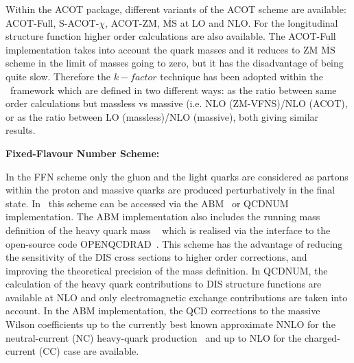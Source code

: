 \begin{description}
Within the ACOT package, different variants of the ACOT scheme are available:
ACOT-Full, S-ACOT-$\chi$, ACOT-ZM, $\overline{\text{MS}}$ at LO and NLO. 
For the longitudinal structure function higher order calculations are also available. 
The ACOT-Full implementation takes into account the quark masses 
and it reduces to ZM $\overline{\text{MS}}$ scheme in the limit of masses going to zero, 
but it has the disadvantage of being quite slow.
Therefore the $k-factor$ technique has been adopted within the \fitter\ framework which are  
defined in two different ways:
as the ratio between same order calculations but massless vs massive 
(i.e. NLO (ZM-VFNS)/NLO (ACOT), or as the ratio between LO (massless)/NLO (massive),
both giving similar results.
%
%
%
\vspace{0.1cm}
\item \bf {Fixed-Flavour Number Scheme:} \rm

In the FFN scheme only the gluon and the light quarks are considered
as partons within the proton and massive quarks are produced perturbatively in the final state.
In \fitter\ this scheme can be accessed via the ABM~\cite{openqcdrad:page} or
QCDNUM implementation.
The ABM implementation also includes the running mass definition of the heavy quark 
mass ~\cite{Alekhin:runm} which is realised via the interface to the 
open-source code OPENQCDRAD~\cite{openqcdrad:page}.
This scheme has the advantage of reducing the sensitivity of the DIS cross sections to
higher order corrections, and improving the theoretical precision of the mass definition. 
In QCDNUM, the calculation of the heavy quark contributions to DIS structure functions
are available at NLO and only electromagnetic exchange contributions are taken into account.
In the ABM implementation, the QCD corrections to the massive Wilson coefficients 
up to the currently best known approximate NNLO for the neutral-current (NC) 
heavy-quark production~\cite{SMoch:npb864} and up to NLO
for the charged-current (CC) case are available.
\end{description}

